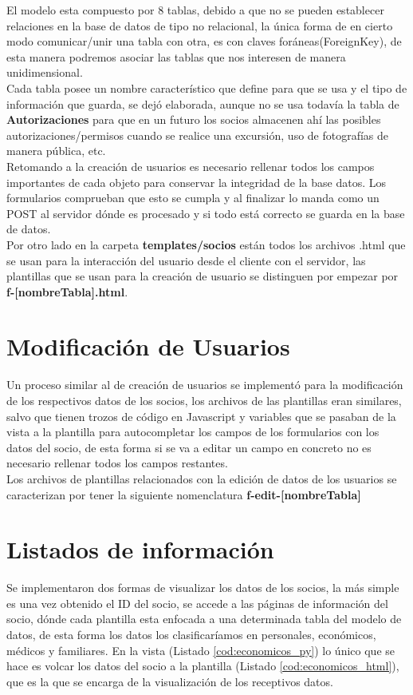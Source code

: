 El modelo esta compuesto por 8 tablas, debido a que no se pueden establecer relaciones en la base de datos de tipo no relacional, la única forma de en cierto modo comunicar/unir una tabla con otra,
es con claves foráneas(ForeignKey), de esta manera podremos asociar las tablas que nos interesen de manera unidimensional.\\

Cada tabla posee un nombre característico que define para que se usa y el tipo de información que guarda, se dejó elaborada, aunque no se usa todavía la tabla de \textbf{Autorizaciones} para que en un futuro los socios almacenen ahí las posibles autorizaciones/permisos
cuando se realice una excursión, uso de fotografías de manera pública, etc.\\

Retomando a la creación de usuarios es necesario rellenar todos los campos importantes de cada objeto para conservar la integridad de la base datos. Los formularios comprueban que esto se cumpla y al finalizar lo manda como un POST
al servidor dónde es procesado y si todo está correcto se guarda en la base de datos.\\

Por otro lado en la carpeta \textbf{templates/socios} están todos los archivos .html que se usan para la interacción del usuario desde el cliente con el servidor, las plantillas que se usan para la creación de usuario se distinguen por 
empezar por \textbf{f-[nombreTabla].html}.


\section{Modificación de Usuarios}
\label{4:sec6}
Un proceso similar al de creación de usuarios se implementó para la modificación de los respectivos datos de los socios, los archivos de las plantillas eran similares, salvo que tienen trozos de código en Javascript
y variables que se pasaban de la vista a la plantilla para autocompletar los campos de los formularios con los datos del socio, de esta forma si se va a editar un campo en concreto no es necesario rellenar 
todos los campos restantes.\\

Los archivos de plantillas relacionados con la edición de datos de los usuarios se caracterizan por tener la siguiente nomenclatura \textbf{f-edit-[nombreTabla]}
\section{Listados de información}
\label{4:sec7}
Se implementaron dos formas de visualizar los datos de los socios, la más simple es una vez obtenido el ID del socio, se accede a las páginas de información del socio, dónde cada plantilla esta enfocada a una determinada tabla
del modelo de datos, de esta forma los datos los clasificaríamos en personales, económicos, médicos y familiares. En la vista (Listado \ref{cod:economicos_py}) lo único que se hace es volcar los datos del socio a la plantilla 
(Listado \ref{cod:economicos_html}), que es la que se encarga de la visualización de los receptivos datos.

